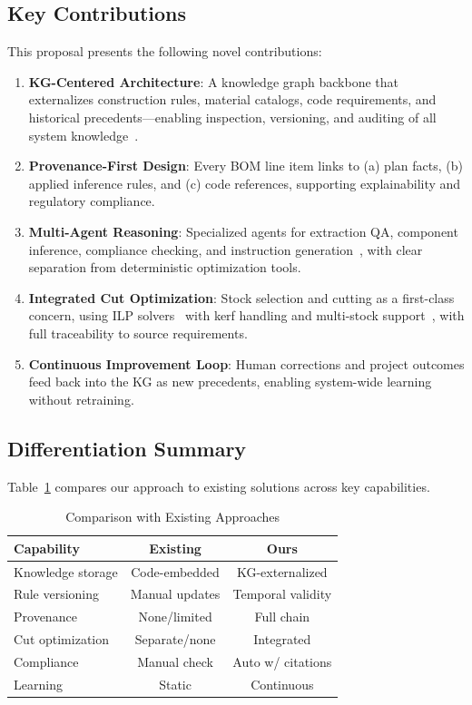 \subsection{Key Contributions}

This proposal presents the following novel contributions:

\begin{enumerate}
  \item \textbf{KG-Centered Architecture}: A knowledge graph backbone that externalizes construction rules, material catalogs, code requirements, and historical precedents---enabling inspection, versioning, and auditing of all system knowledge~\cite{pan2024unifying_kg_llm}.

  \item \textbf{Provenance-First Design}: Every BOM line item links to (a) plan facts, (b) applied inference rules, and (c) code references, supporting explainability and regulatory compliance.

  \item \textbf{Multi-Agent Reasoning}: Specialized agents for extraction QA, component inference, compliance checking, and instruction generation~\cite{li2025agentic_survey, zhang2025tool_learning}, with clear separation from deterministic optimization tools.

  \item \textbf{Integrated Cut Optimization}: Stock selection and cutting as a first-class concern, using ILP solvers~\cite{ortools2024} with kerf handling and multi-stock support~\cite{gilmore1961cutting}, with full traceability to source requirements.

  \item \textbf{Continuous Improvement Loop}: Human corrections and project outcomes feed back into the KG as new precedents, enabling system-wide learning without retraining.
\end{enumerate}

\subsection{Differentiation Summary}

Table~\ref{tab:differentiation} compares our approach to existing solutions across key capabilities.

\begin{table}[ht]
\centering
\caption{Comparison with Existing Approaches}
\label{tab:differentiation}
\begin{tabular}{lcc}
\toprule
\textbf{Capability} & \textbf{Existing} & \textbf{Ours} \\
\midrule
Knowledge storage & Code-embedded & KG-externalized \\
Rule versioning & Manual updates & Temporal validity \\
Provenance & None/limited & Full chain \\
Cut optimization & Separate/none & Integrated \\
Compliance & Manual check & Auto w/ citations \\
Learning & Static & Continuous \\
\bottomrule
\end{tabular}
\end{table}
